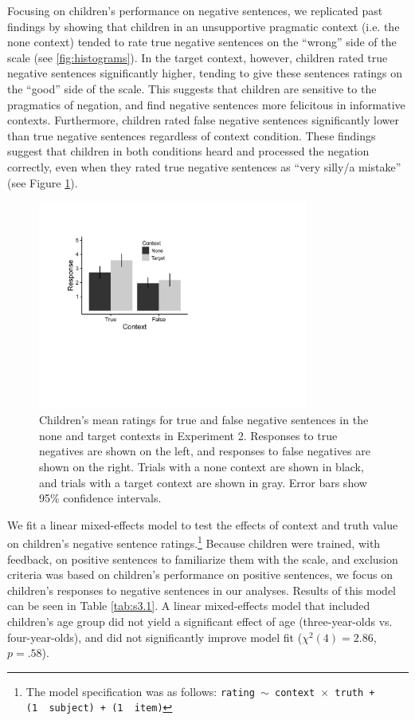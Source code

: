 \documentclass[man, noapacite]{apa2}
\begin{document}
Focusing on children's performance on negative sentences, we replicated past findings by showing that children in an unsupportive pragmatic context (i.e. the none context) tended to rate true negative sentences on the ``wrong'' side of the scale (see \ref{fig:histograms}). In the target context, however, children rated true negative sentences significantly higher, tending to give these sentences ratings on the ``good'' side of the scale. This suggests that children are sensitive to the pragmatics of negation, and find negative sentences more felicitous in informative contexts. Furthermore, children rated false negative sentences significantly lower than true negative sentences regardless of context condition. These findings suggest that children in both conditions heard and processed the negation correctly, even when they rated true negative sentences as ``very silly/a mistake'' (see Figure \ref{fig:childmeans}).

\begin{figure}
\begin{center}
\includegraphics[width=3.5in]{figures/childmeans.pdf}
\caption{\label{fig:childmeans} Children's mean ratings for true and false negative sentences in the none and target contexts in Experiment 2. Responses to true negatives are shown on the left, and responses to false negatives are shown on the right. Trials with a none context are shown in black, and trials with a target context are shown in gray. Error bars show 95\% confidence intervals.}
\end{center}
\end{figure}

We fit a linear mixed-effects model to test the effects of context and truth value on children's negative sentence ratings.\footnote{ The model specification was as follows: \texttt{rating $\sim$ context~$\times$~truth + (1~\textbar~subject) + (1~\textbar~item)}} Because children were trained, with feedback, on positive sentences to familiarize them with the scale, and exclusion criteria was based on children's performance on positive sentences, we focus on children's responses to negative sentences in our analyses. Results of this model can be seen in Table \ref{tab:s3.1}. A linear mixed-effects model that included children's age group did not yield a significant effect of age (three-year-olds vs. four-year-olds), and did not significantly improve model fit ($\chi ^{2}(4) = 2.86$, $p=.58$).
\end{document}
